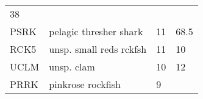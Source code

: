 \documentclass[]{article}
\begin{document}
\begin{longtable}[c]{@{}llll@{}}
\begin{minipage}[t]{0.23\columnwidth}
38
\end{minipage}
\\\addlinespace
\begin{minipage}[t]{0.08\columnwidth}\raggedright
PSRK
\end{minipage} & \begin{minipage}[t]{0.36\columnwidth}\raggedright
pelagic thresher shark
\end{minipage} & \begin{minipage}[t]{0.21\columnwidth}\raggedright
11
\end{minipage} & \begin{minipage}[t]{0.23\columnwidth}\raggedright
68.5
\end{minipage}
\\\addlinespace
\begin{minipage}[t]{0.08\columnwidth}\raggedright
RCK5
\end{minipage} & \begin{minipage}[t]{0.36\columnwidth}\raggedright
unsp. small reds rckfsh
\end{minipage} & \begin{minipage}[t]{0.21\columnwidth}\raggedright
11
\end{minipage} & \begin{minipage}[t]{0.23\columnwidth}\raggedright
10
\end{minipage}
\\\addlinespace
\begin{minipage}[t]{0.08\columnwidth}\raggedright
UCLM
\end{minipage} & \begin{minipage}[t]{0.36\columnwidth}\raggedright
unsp. clam
\end{minipage} & \begin{minipage}[t]{0.21\columnwidth}\raggedright
10
\end{minipage} & \begin{minipage}[t]{0.23\columnwidth}\raggedright
12
\end{minipage}
\\\addlinespace
\begin{minipage}[t]{0.08\columnwidth}\raggedright
PRRK
\end{minipage} & \begin{minipage}[t]{0.36\columnwidth}\raggedright
pinkrose rockfish
\end{minipage} & \begin{minipage}[t]{0.21\columnwidth}\raggedright
9
\end{minipage} & \begin{minipage}[t]{0.23\columnwidth}\raggedright

\end{minipage}
\end{longtable}
\end{document}
